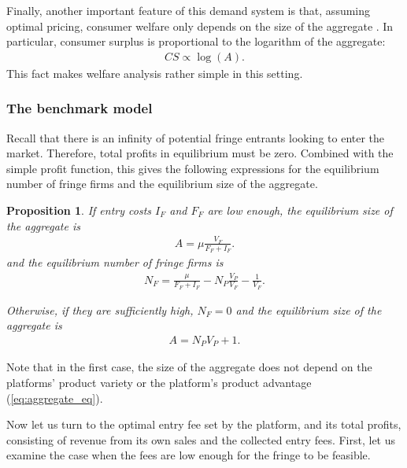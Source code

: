 \documentclass[a4paper]{article}
\newtheorem{proposition}{Proposition}
\begin{document}
Finally, another important feature of this demand system is that, assuming optimal pricing, consumer welfare only depends on the size of the aggregate \parencite{anderson2020aggregative}.
In particular, consumer surplus is proportional to the logarithm of the aggregate:
\begin{align*}
    CS \propto \log(A).
\end{align*}
This fact makes welfare analysis rather simple in this setting.

\subsubsection{The benchmark model}

Recall that there is an infinity of potential fringe entrants looking to enter the market.
Therefore, total profits in equilibrium must be zero.
Combined with the simple profit function, this gives the following expressions for the equilibrium number of fringe firms and the equilibrium size of the aggregate.
\begin{proposition}
    \label{prop:equilibrium_aggregate}
    If entry costs $I_F$ and $F_F$ are low enough, the equilibrium size of the aggregate is
    \begin{align}
        A = \mu \frac{V_F}{F_F + I_F}.
        \label{eq:aggregate_eq}
    \end{align}
    and the equilibrium number of fringe firms is
    \begin{align*}
        N_F = \frac{\mu}{F_F + I_F} - N_P \frac{V_P}{V_F} - \frac{1}{V_F}.
    \end{align*}

    Otherwise, if they are sufficiently high, $N_F = 0$ and the equilibrium size of the aggregate is
    \begin{align*}
        A = N_P V_P + 1.
    \end{align*}
\end{proposition}
Note that in the first case, the size of the aggregate does not depend on the platforms' product variety or the platform's product advantage (\cref{eq:aggregate_eq}).

Now let us turn to the optimal entry fee set by the platform, and its total profits, consisting of revenue from its own sales and the collected entry fees.
First, let us examine the case when the fees are low enough for the fringe to be feasible.
\end{document}
